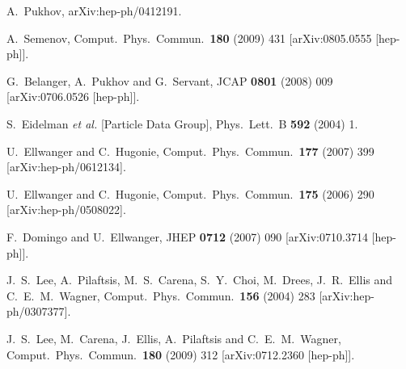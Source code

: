 \documentclass[12pt,a4paper]{article}
\begin{document}
\begin{thebibliography}{}
  A.~Pukhov,
  arXiv:hep-ph/0412191.

  A.~Semenov,
  Comput.\ Phys.\ Commun.\  {\bf 180} (2009) 431
  [arXiv:0805.0555 [hep-ph]].

  G.~Belanger, A.~Pukhov and G.~Servant,
  JCAP {\bf 0801} (2008) 009
  [arXiv:0706.0526 [hep-ph]].

  S.~Eidelman {\it et al.}  [Particle Data Group],
  Phys.\ Lett.\  B {\bf 592} (2004) 1.



  U.~Ellwanger and C.~Hugonie,
  Comput.\ Phys.\ Commun.\  {\bf 177} (2007) 399
  [arXiv:hep-ph/0612134].
  
  U.~Ellwanger and C.~Hugonie,
  Comput.\ Phys.\ Commun.\  {\bf 175} (2006) 290
  [arXiv:hep-ph/0508022].
  
  F.~Domingo and U.~Ellwanger,
  JHEP {\bf 0712} (2007) 090
  [arXiv:0710.3714 [hep-ph]].
  
  
  J.~S.~Lee, A.~Pilaftsis, M.~S.~Carena, S.~Y.~Choi, M.~Drees, J.~R.~Ellis and C.~E.~M.~Wagner,
  Comput.\ Phys.\ Commun.\  {\bf 156} (2004) 283
  [arXiv:hep-ph/0307377].

  J.~S.~Lee, M.~Carena, J.~Ellis, A.~Pilaftsis and C.~E.~M.~Wagner,
  Comput.\ Phys.\ Commun.\  {\bf 180} (2009) 312
  [arXiv:0712.2360 [hep-ph]].
  

\end{thebibliography}
\end{document}
